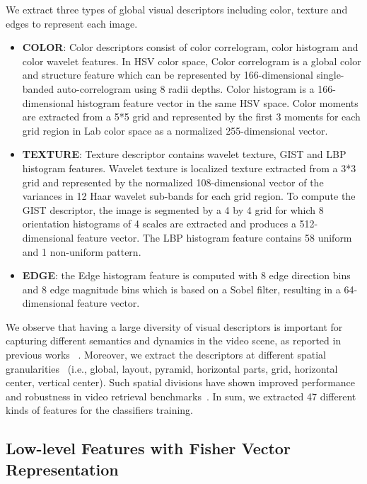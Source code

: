 \documentclass[11pt,twocolumn,twoside]{IEEEtran}
\begin{document}
We extract three types of global visual descriptors including color, texture and edges to represent each image. %
\begin{itemize}

\item \textbf{COLOR}: Color descriptors consist of color correlogram, color histogram and color wavelet features. In HSV color space, Color correlogram is a global color and structure feature
which can be represented by 166-dimensional single-banded auto-correlogram using 8 radii depths. Color histogram is a 166-dimensional histogram feature vector in the same HSV space. Color moments are extracted from a 5*5 grid and represented by the first 3 moments for each grid region in Lab color space as a normalized 255-dimensional vector.

\item \textbf{TEXTURE}: Texture descriptor contains wavelet texture, GIST and LBP histogram features.  Wavelet texture is localized texture extracted from a 3*3 grid and represented by the normalized 108-dimensional vector of the variances in 12 Haar wavelet sub-bands for each grid region.  To compute the GIST descriptor, the image is segmented by a 4 by 4 grid for which 8 orientation histograms of 4 scales are extracted and produces a 512-dimensional feature vector. The LBP histogram feature contains 58 uniform and 1 non-uniform pattern.

\item \textbf{EDGE}: the Edge histogram feature is computed with 8 edge direction bins and 8 edge magnitude bins which is based on a Sobel filter,  resulting in a 64-dimensional feature vector.

\end{itemize}

We observe that having a large diversity of visual descriptors is important for capturing different semantics and dynamics in the video scene, as reported in previous works ~\cite{Michele_TMM13}.
Moreover, we extract the descriptors at different spatial granularities ~(i.e., global, layout, pyramid, horizontal parts, grid, horizontal center, vertical center). Such spatial divisions have shown improved performance and robustness in video retrieval benchmarks~\cite{TRECVID07}. In sum, we extracted 47 different kinds of features for the classifiers training.

\subsection{Low-level Features with Fisher Vector Representation}\label{subsec2}
\end{document}
